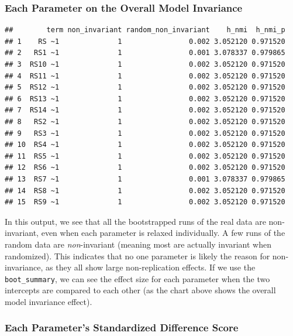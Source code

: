 \documentclass[
  man]{apa7}
\begin{document}
\hypertarget{each-parameter-on-the-overall-model-invariance}{%
\subsubsection{Each Parameter on the Overall Model Invariance}\label{each-parameter-on-the-overall-model-invariance}}

\begin{verbatim}
##        term non_invariant random_non_invariant    h_nmi  h_nmi_p
## 1    RS ~1              1                0.002 3.052120 0.971520
## 2   RS1 ~1              1                0.001 3.078337 0.979865
## 3  RS10 ~1              1                0.002 3.052120 0.971520
## 4  RS11 ~1              1                0.002 3.052120 0.971520
## 5  RS12 ~1              1                0.002 3.052120 0.971520
## 6  RS13 ~1              1                0.002 3.052120 0.971520
## 7  RS14 ~1              1                0.002 3.052120 0.971520
## 8   RS2 ~1              1                0.002 3.052120 0.971520
## 9   RS3 ~1              1                0.002 3.052120 0.971520
## 10  RS4 ~1              1                0.002 3.052120 0.971520
## 11  RS5 ~1              1                0.002 3.052120 0.971520
## 12  RS6 ~1              1                0.002 3.052120 0.971520
## 13  RS7 ~1              1                0.001 3.078337 0.979865
## 14  RS8 ~1              1                0.002 3.052120 0.971520
## 15  RS9 ~1              1                0.002 3.052120 0.971520
\end{verbatim}

In this output, we see that all the bootstrapped runs of the real data are non-invariant, even when each parameter is relaxed individually. A few runs of the random data are \emph{non}-invariant (meaning most are actually invariant when randomized). This indicates that no one parameter is likely the reason for non-invariance, as they all show large non-replication effects. If we use the \texttt{boot\_summary}, we can see the effect size for each parameter when the two intercepts are compared to each other (as the chart above shows the overall model invariance effect).

\hypertarget{each-parameters-standardized-difference-score}{%
\subsubsection{Each Parameter's Standardized Difference Score}\label{each-parameters-standardized-difference-score}}
\end{document}
